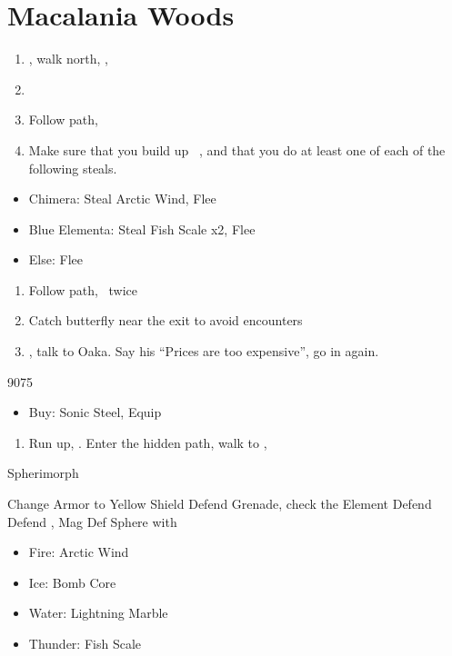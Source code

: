 \chapter{Macalania Woods}

\begin{enumerate}
  \item \sd, walk north, \sd, \save
  \item \formation{\tidus}{\rikku}{\auron}
  \item Follow path, 
  \item Make sure that you build up \rikku\ \od, and that you do at least one of each of the following steals.
\end{enumerate}
\begin{encounters}
  \begin{itemize}
    \item Chimera: Steal Arctic Wind, Flee
    \item Blue Elementa: Steal Fish Scale x2, Flee
    \item Else: Flee
  \end{itemize}
\end{encounters}
\begin{enumerate}[resume]
  \item Follow path, \sd\ twice
  \item Catch butterfly near the exit to avoid encounters
        \formation{\tidus}{\yuna}{\kimahri}
  \item \save, talk to Oaka. Say his ``Prices are too expensive'', go in again.
\end{enumerate}
\begin{shop}{9075}
  \begin{itemize}
    \item Buy: Sonic Steel, Equip
  \end{itemize}
\end{shop}
\begin{enumerate}[resume]
  \item Run up, \sd. Enter the hidden path, walk to \auron, \sd
\end{enumerate}
\begin{battle}[12000]{Spherimorph}
  \begin{itemize}
    \tidusf Change Armor to Yellow Shield
    \tidusf Defend
    \switch{\tidus}{\rikku}
    \rikkuf Grenade, check the Element
    \kimahrif Defend
    \yunaf Defend
    \rikkuf \od, Mag Def Sphere with
    \begin{itemize}
      \item Fire: Arctic Wind
      \item Ice: Bomb Core
      \item Water: Lightning Marble
      \item Thunder: Fish Scale
    \end{itemize}
  \end{itemize}
\end{battle}
